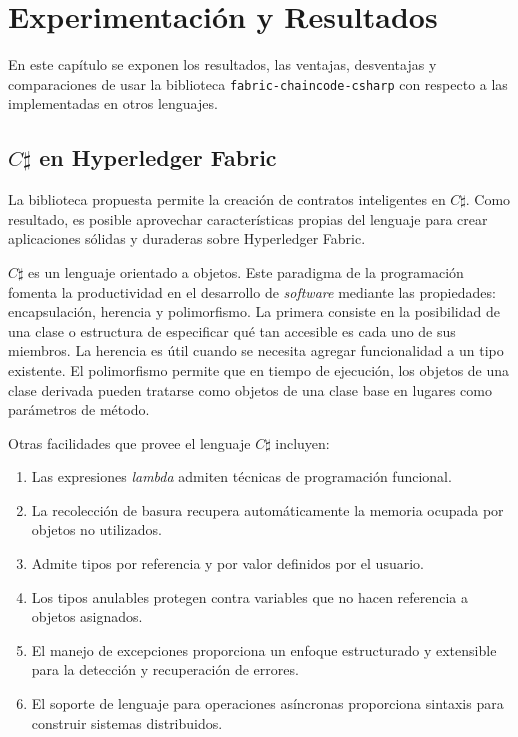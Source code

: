 \chapter{Experimentación y Resultados}\label{chapter:implementation}
En este capítulo se exponen los resultados, las ventajas, desventajas y comparaciones de usar la biblioteca \texttt{fabric-chaincode-csharp} con respecto a las implementadas en otros lenguajes.

\section{$ C\sharp $ en Hyperledger Fabric}
La biblioteca propuesta permite la creación de contratos inteligentes en  $ C\sharp $. Como resultado, es posible aprovechar características propias del lenguaje para crear aplicaciones sólidas y duraderas sobre Hyperledger Fabric.

$ C\sharp $ es un lenguaje orientado a objetos. Este paradigma de la programación fomenta la productividad en el desarrollo de \textit{software} mediante las propiedades: encapsulación, herencia y polimorfismo. La primera consiste en la posibilidad de una clase o estructura de especificar qué tan accesible es cada uno de sus miembros. La herencia es útil cuando se necesita agregar funcionalidad a un tipo existente. El polimorfismo permite que en tiempo de ejecución, los objetos de una clase derivada pueden tratarse como objetos de una clase base en lugares como parámetros de método.

Otras facilidades que provee el lenguaje $ C\sharp $ incluyen:

\begin{enumerate}
\item Las expresiones \textit{lambda} admiten técnicas de programación funcional.

\item La recolección de basura recupera automáticamente la memoria ocupada por objetos no utilizados.

\item  Admite tipos por referencia y por valor definidos por el usuario. 

\item  Los tipos anulables protegen contra variables que no hacen referencia a objetos asignados.

\item El manejo de excepciones proporciona un enfoque estructurado y extensible para la detección y recuperación de errores.

\item El soporte de lenguaje para operaciones asíncronas proporciona sintaxis para construir sistemas distribuidos.

\end{enumerate}

